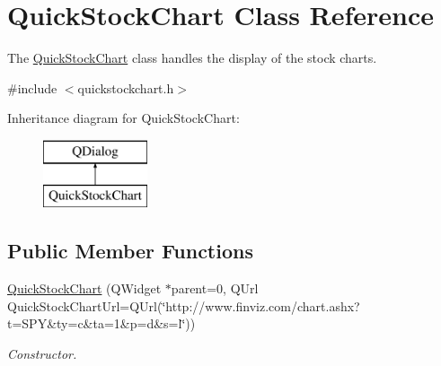 \hypertarget{class_quick_stock_chart}{\section{Quick\+Stock\+Chart Class Reference}
\label{class_quick_stock_chart}
}


The \hyperlink{class_quick_stock_chart}{Quick\+Stock\+Chart} class handles the display of the stock charts.  




{\ttfamily \#include $<$quickstockchart.\+h$>$}

Inheritance diagram for Quick\+Stock\+Chart\+:\begin{figure}[H]
\begin{center}
\leavevmode
\includegraphics[height=2.000000cm]{class_quick_stock_chart}
\end{center}
\end{figure}
\subsection*{Public Member Functions}
\begin{DoxyCompactItemize}
\item 
\hyperlink{class_quick_stock_chart_abbde5e3fbc236b66dad067b652c58837}{Quick\+Stock\+Chart} (Q\+Widget $\ast$parent=0, Q\+Url Quick\+Stock\+Chart\+Url=Q\+Url(\char`\"{}http\+://www.\+finviz.\+com/chart.\+ashx?t=S\+P\+Y\&ty=c\&ta=1\&p=d\&s=l\char`\"{}))
\begin{DoxyCompactList}\small\item\em Constructor. \end{DoxyCompactList}\end{DoxyCompactItemize}
